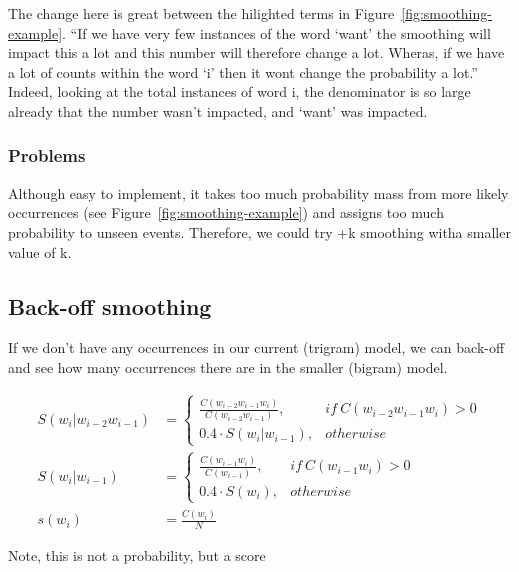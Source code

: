 \documentclass[11pt]{article}
\begin{document}
The change here is great between the hilighted terms in Figure~\ref{fig:smoothing-example}. ``If we have very few instances of the word `want' the smoothing will impact this a lot and this number will therefore change a lot. Wheras, if we have a lot of counts within the word `i' then it wont change the probability a lot.'' Indeed, looking at the total instances of word i, the denominator is so large already that the number wasn't impacted, and `want' was impacted.

\subsubsection{Problems}

Although easy to implement, it takes too much probability mass from more likely occurrences (see Figure~\ref{fig:smoothing-example}) and assigns too much probability to unseen events. Therefore, we could try +k smoothing witha  smaller value of k.

\subsection{Back-off smoothing}

If we don't have any occurrences in our current (trigram) model, we can back-off and see how many occurrences there are in the smaller (bigram) model.

\begin{definition}
    \begin{align*}
        S(w_i|w_{i-2}w_{i-1}) &=
        \begin{cases}
            \frac{C(w_{i-2}w_{i-1}w_i)}{C(w_{i-2}w_{i-1})} , & if\ C(w_{i-2}w_{i-1}w_i) > 0 \\
            0.4 \cdot S(w_i|w_{i-1}) , & otherwise    
        \end{cases} \\
        S(w_i|w_{i-1}) &=
        \begin{cases}
            \frac{C(w_{i-1}w_i)}{C(w_{i-1})} , & if\ C(w_{i-1}w_i) > 0 \\
            0.4 \cdot S(w_i) , & otherwise    
        \end{cases} \\
        s(w_i) &= \frac{C(w_i)} N
    \end{align*}    

    \begin{warning}
        Note, this is not a probability, but a score
    \end{warning}
\end{definition}
\end{document}
